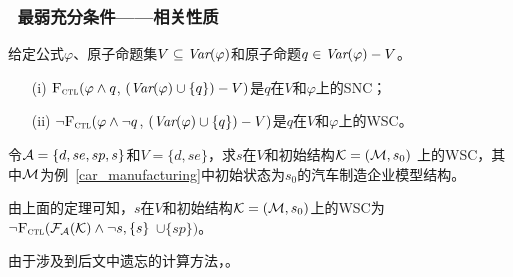 \documentclass[9pt, CJK]{beamer}
\begin{document}
\begin{frame}
	\frametitle{~最弱充分条件——{\footnotesize 相关性质}}
	{\footnotesize
		\begin{theorem}\label{thm:SNC:WSC:forget}
		给定公式$\varphi$、原子命题集$V\subseteq\textit{Var}(\varphi)$和原子命题$q\in\textit{Var}(\varphi)- V$。
		\begin{itemize}
			\item[(i)] ${\textsc{F}_{\textsc{ctl}}} (\varphi \land q$, $(\textit{Var}(\varphi) \cup \{q\}) - V)$是$q$在$V$和$\varphi$上的SNC；
			\item[(ii)]  $\neg{\textsc{F}_{\textsc{ctl}}} (\varphi \land \neg q$, $(\textit{Var}(\varphi) \cup \{q\}) - V)$是$q$在$V$和$\varphi$上的WSC。
		\end{itemize}
	\end{theorem}
	\begin{example}
		\label{exam:SNCandWSC}
		令${\cal A}=\{d,se,sp,s\}$和$V=\{d,se\}$，求$s$在$V$和初始结构${\cal K} = ({\cal M},s_0)$ 上的WSC，其中${\cal M}$为例~\ref{car_manufacturing}中初始状态为$s_0$的汽车制造企业模型结构。
		
		由上面的定理可知，$s$在$V$和初始结构${\cal K} = ({\cal M},s_0)$上的WSC为$\neg {\textsc{F}_{\textsc{ctl}}}({\cal F}_{{\cal A}}({\cal K}) \wedge \neg s, \{s\}$ $\cup \{sp\})$。
		
		由于涉及到后文中遗忘的计算方法，。
	\end{example}
	}
\end{frame}
\end{document}
